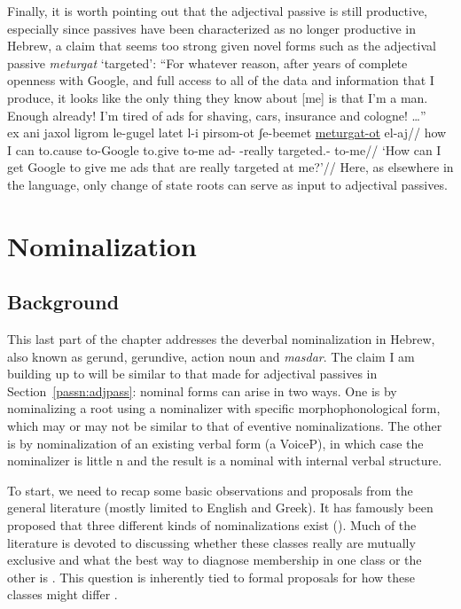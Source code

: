 Finally, it is worth pointing out that {the adjectival passive} is still productive, especially since passives have been characterized as no longer productive in Hebrew, a claim that seems too strong given novel forms such as{ the adjectival passive} \emph{meturgat} `targeted':
\ex ``For whatever reason, after years of complete openness with Google, and full access to all of the data and information that I produce, it looks like the only thing they know about [me] is that I'm a man. Enough already! I'm tired of ads for shaving, cars, insurance and cologne! \dots ''\\
	\begingl
		\gla ex ani jaxol ligrom le-gugel latet l-i pirsom-ot ʃe-beemet \underline{meturgat-ot} el-aj//
		\glb how I can to.cause to-Google to.give to-me ad- -really targeted.- to-me//
		\glft `How can I get Google to give me ads that are really targeted at me?'//
	\endgl
\xe
Here, as elsewhere in the language, only change of state roots can serve as input to adjectival passives.


\section{Nominalization} \label{passn:n}
	\subsection{Background}
This last part of the chapter addresses the deverbal nominalization in Hebrew, also known as gerund, gerundive, action noun and \emph{masdar}. The claim I am building up to will be similar to that made for adjectival passives in Section~\ref{passn:adjpass}: nominal forms can arise in two ways. One is by nominalizing a root using a nominalizer with specific morphophonological form, which may or may not be similar to that of eventive nominalizations. The other is by nominalization of an existing verbal form (a VoiceP), in which case the nominalizer is little n and the result is a nominal with internal verbal structure.

To start, we need to recap some basic observations and proposals from the general literature (mostly limited to English and Greek). It has famously been proposed \citep{grimshaw90} that three different kinds of nominalizations exist (\nextx). Much of the literature is devoted to discussing whether these classes really are mutually exclusive and what the best way to diagnose membership in one class or the other is \citep{alexiadou01,alexiadou09,alexiadou10b,alexiadou17,borer13oup,borer14lingua}. This question is inherently tied to formal proposals for how these classes might differ \citep{chomsky70,marantz97,harley09n,bruening13}.

